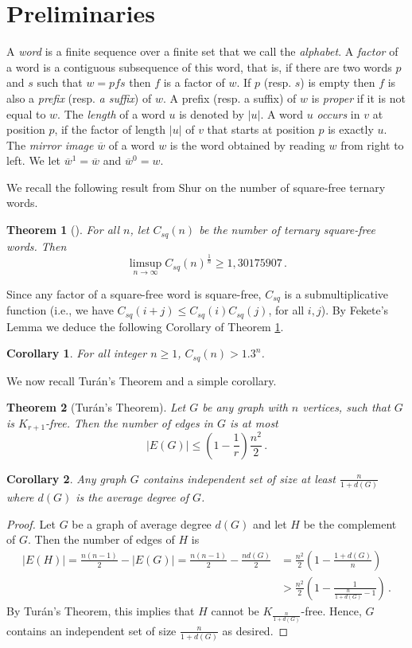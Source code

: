 \documentclass[a4paper,12pt]{article}
\newtheorem{theorem}{Theorem}
\newtheorem{corollary}{Corollary}
\begin{document}
\section{Preliminaries}\label{secpr}
A \emph{word} is a finite sequence over a finite set that we call the \emph{alphabet}. A \emph{factor} of a word is a contiguous subsequence of this word, that is,  if there are two words $p$ and $s$ such that $w=pfs$ then $f$ is a factor of $w$. If $p$ (resp. $s$) is empty then $f$ is also a \emph{prefix} (resp.  \emph{a suffix}) of $w$. A prefix (resp. a suffix) of $w$ is \emph{proper} if it is not equal to $w$.
The \emph{length} of a word $u$ is denoted by $|u|$.
A word $u$ \emph{occurs} in $v$ at position $p$, if the factor of length $|u|$ of $v$ that starts at position $p$ is exactly $u$.
The \emph{mirror image} $\overline{w}$ of a word $w$ is the word obtained by reading $w$ from right to left. We let $\overline{w}^1 = \overline{w}$ and $\overline{w}^0 = w$.

We recall the following result from Shur on the number of square-free ternary words.
\begin{theorem}[\cite{shursqf}]\label{growthsqfree}
 For all $n$, let $C_{sq}(n)$ be the number of ternary square-free words. Then 
 $$\limsup_{n\rightarrow \infty} C_{sq}(n)^{\frac{1}{n}}\ge 1,30175907\,.$$
\end{theorem}
Since any factor of a square-free word is square-free, $C_{sq}$ is a submultiplicative function (i.e., we have $C_{sq}(i+j)\le C_{sq}(i)C_{sq}(j)$,  for all $i,j$). 
By Fekete's Lemma we deduce the following Corollary of Theorem \ref{growthsqfree}.
\begin{corollary}\label{explbonsqfree}
  For all  integer $n\ge1$,  $C_{sq}(n)> 1.3^n$. 
\end{corollary}

We now recall Tur\'an's Theorem and a simple corollary.
\begin{theorem}[Tur\'an's Theorem]
Let $G$ be any graph with $n$ vertices, such that $G$ is $K_{r+1}$-free. Then the number of edges in $G$ is at most 
$$|E(G)|\le \left(1-\frac{1}{r}\right)\frac{n^2}{2}\,.$$ 
\end{theorem}
\begin{corollary}\label{exindepset}
Any graph $G$ contains independent set of size at least $\frac{n}{1+d(G)}$ where $d(G)$ is the average degree of $G$.
\end{corollary}
\begin{proof}
 Let $G$ be a graph of average degree $d(G)$ and let $H$ be the complement of $G$. 
 Then the number of edges of $H$ is
\begin{align*}
 |E(H)|=\frac{n(n-1)}{2}-|E(G)|=\frac{n(n-1)}{2} -\frac{nd(G)}{2}&=\frac{n^2}{2}\left(1-\frac{1+d(G)}{n}\right)\\
 &>\frac{n^2}{2}\left(1-\frac{1}{\frac{n}{1+d(G)}-1}\right)\,.
\end{align*}
 By Tur\'an's Theorem, this implies that $H$ cannot be $K_{\frac{n}{1+d(G)}}$-free. Hence, $G$ contains an independent set of size $\frac{n}{1+d(G)}$ as desired.
\end{proof}
\end{document}
